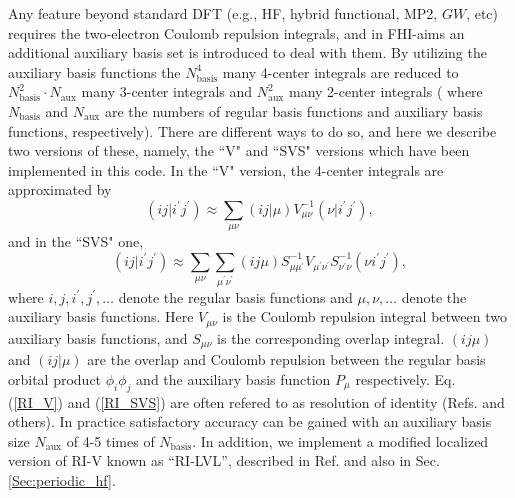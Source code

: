 Any feature beyond standard DFT (e.g., HF, hybrid functional,
MP2, $GW$, etc) requires the two-electron Coulomb repulsion integrals, and 
in FHI-aims an additional auxiliary basis set is introduced to deal with 
them. By utilizing the auxiliary basis functions the $N_\text{basis}^4$ many 
4-center integrals are reduced to $N_\text{basis}^2\cdot N_\text{aux}$
many 3-center integrals and  $N_\text{aux}^2$ many 2-center integrals (
where $N_\text{basis}$ and $N_\text{aux}$ are the numbers of regular basis
functions and auxiliary basis functions, respectively). There are different
ways to do so, and here we describe two versions of these, namely, the
 ``V" and ``SVS" \cite{Vahtras93} versions which have been implemented in 
this code. In the ``V" version, the 4-center integrals are approximated by
  \begin{equation}
   (ij|i^\prime j^\prime) \approx \sum_{\mu\nu} (ij|\mu)V_{\mu\nu}^{-1} 
   (\nu|i^\prime j^\prime),
  \label{RI_V}
  \end{equation}
and in the ``SVS" one,
  \begin{equation}
   (ij|i^\prime j^\prime) \approx \sum_{\mu\nu} \sum_{\mu^\prime\nu^\prime}
 (ij\mu)S_{\mu\mu^\prime}^{-1}V_{\mu^\prime\nu^\prime}S_{\nu^\prime\nu}^{-1} 
   (\nu i^\prime j^\prime),
  \label{RI_SVS}
  \end{equation}
where $i,j,i^\prime,j^\prime, \dots$ denote the regular basis functions 
and $\mu,\nu, \dots$ denote the auxiliary basis functions. 
Here $V_{\mu\nu}$ is the Coulomb repulsion integral between two auxiliary basis 
functions, and $S_{\mu\nu}$ is the corresponding overlap integral. 
$(ij\mu)$ and $(ij|\mu)$ are the overlap and Coulomb repulsion between the 
regular basis orbital product 
$\phi_i\phi_j$ and the auxiliary basis function $P_\mu$ respectively.
Eq. (\ref{RI_V}) and (\ref{RI_SVS}) are often refered to as
resolution of identity (Refs. \cite{Boys59,Alsenoy88,Vahtras93,Eichkorn95} and
others).  In practice satisfactory accuracy can be gained with 
an auxiliary basis size $N_\text{aux}$ of 4-5 times of
$N_\text{basis}$. In addition, we implement a modified localized
version of RI-V known as ``RI-LVL'', described in
Ref. \cite{Ihrig2015} and also in Sec. \ref{Sec:periodic_hf}.


